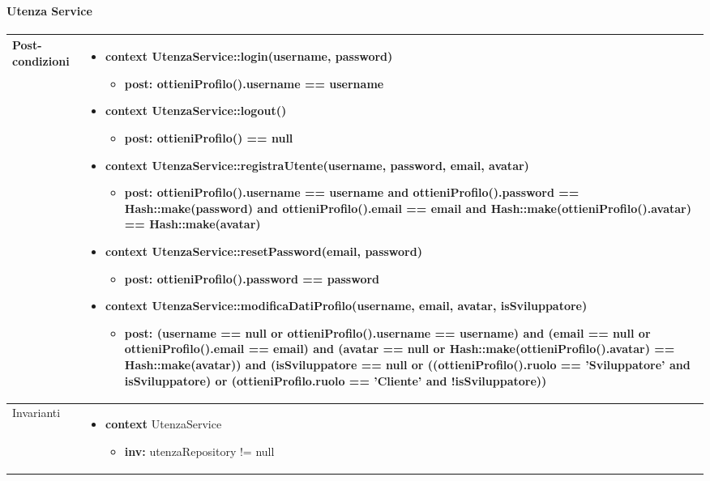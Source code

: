 \paragraph{Utenza Service}
\small\begin{tabular}{|| l | p{28em} ||} 
\hline
Post-condizioni & \begin{itemize}[leftmargin=*]
	\item \textbf{context} UtenzaService::login(username, password)
	\begin{itemize}
		\item[ ] \textbf{post:} ottieniProfilo().username == username
	\end{itemize}

	\item \textbf{context} UtenzaService::logout()
	\begin{itemize}
		\item[ ] \textbf{post:} ottieniProfilo() == null
	\end{itemize}
	
	\item \textbf{context} UtenzaService::registraUtente(username, password, email, avatar)
	\begin{itemize}
		\item[ ] \textbf{post:} ottieniProfilo().username == username and ottieniProfilo().password == Hash::make(password) and ottieniProfilo().email == email and Hash::make(ottieniProfilo().avatar) == Hash::make(avatar)
	\end{itemize}

	\item \textbf{context} UtenzaService::resetPassword(email, password)
	\begin{itemize}
		\item[ ] \textbf{post:} ottieniProfilo().password == password
	\end{itemize}
	
	\item \textbf{context} UtenzaService::modificaDatiProfilo(username, email, avatar, isSviluppatore)
	\begin{itemize}
		\item[ ] \textbf{post:} (username == null or ottieniProfilo().username == username) and (email == null or ottieniProfilo().email == email) and (avatar == null or Hash::make(ottieniProfilo().avatar) == Hash::make(avatar)) and (isSviluppatore == null or ((ottieniProfilo().ruolo == 'Sviluppatore' and isSviluppatore) or (ottieniProfilo.ruolo == 'Cliente' and !isSviluppatore))
	\end{itemize}
\end{itemize}\\
\hline
Invarianti & \begin{itemize}
	\item \textbf{context} UtenzaService
	\begin{itemize}
		\item[ ] \textbf{inv:} utenzaRepository != null
	\end{itemize}
\end{itemize}\\
\hline
\end{tabular}

